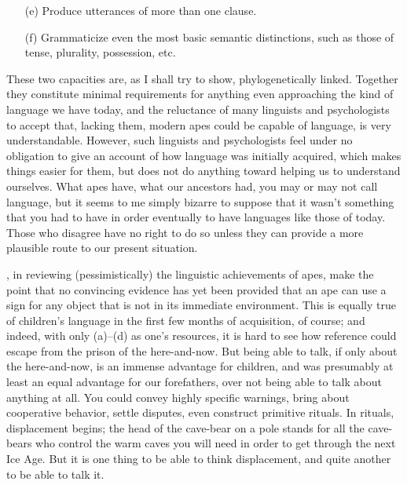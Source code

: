 \begin{itemize}
\item[(e)] Produce utterances of more than one clause.
\item[(f)] Grammaticize even the most basic semantic distinctions, such as those of tense, plurality, possession, etc.
\end{itemize}

These two capacities are, as I shall try to show, phylogenetically linked. Together they constitute minimal requirements for anything even approaching the kind of language we have today, and the reluctance of many linguists and psychologists to accept that, lacking them, modern apes could be capable of language, is very understandable. However, such linguists and psychologists feel under no obligation to give an account of how language was initially acquired, which makes things easier for them, but does not do anything toward helping us to understand ourselves. What apes have, what our ancestors had, you may or may not call language, but it seems to me simply bizarre to suppose that it wasn't something that you had to have in order eventually to have languages like those of today. Those who disagree have no right to do so unless they can provide a more plausible route to our present situation.

\citet{Seidenberg1979}, in reviewing (pessimistically) the linguistic achievements of apes, make the point that no convincing evidence has yet been provided that an ape can use a sign for any object that is not in its immediate environment. This is equally true of children's language in the first few months of acquisition, of course; and indeed, with only (a)--(d) as one's resources, it is hard to see how reference could escape from the prison of the here-and-now. But being able to talk, if only about the here-and-now, is an immense advantage for children, and was presumably at least an equal advantage for our forefathers, over not being able to talk about anything at all. You could convey highly specific warnings, bring about cooperative behavior, settle disputes, even construct primitive rituals. In rituals, displacement begins; the head of the cave-bear on a pole stands for all the cave-bears who control the warm caves you will need in order to get through the next Ice Age. But it is one thing to be able to think displacement, and quite another to be able to talk it.


